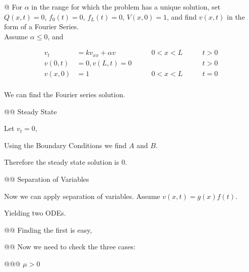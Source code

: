 \documentclass[10pt]{article}
\begin{document}
\begin{easylist}[enumerate]
    @ For $\alpha$ in the range for which the problem has a unique solution, set $Q(x, t) = 0$, $f_0(t)=0$, $f_L(t)=0$,
    $V(x,0)=1$, and find $v(x, t)$ in the form of a Fourier Series.\\

    Assume $\alpha \le 0$, and

    \begin{align*}
        v_t &= k v_{xx} + \alpha v \qquad & 0 < x < L \qquad & t > 0\\
        v(0, t) &= 0, v(L, t) = 0 \qquad && t > 0\\
        v(x, 0) &= 1 \qquad & 0 < x < L \qquad & t = 0\\
    \end{align*}

    We can find the Fourier series solution.

    @@ Steady State

    Let $v_t = 0$,


    Using the Boundary Conditions we find $A$ and $B$.


    Therefore the steady state solution is 0.

    @@ Separation of Variables

    Now we can apply separation of variables. Assume $v(x, t) = g(x)f(t)$.


    Yielding two ODEs.


    @@ Finding the first is easy,


    @@ Now we need to check the three cases:

    @@@ $\mu > 0$



\end{easylist}
\end{document}

